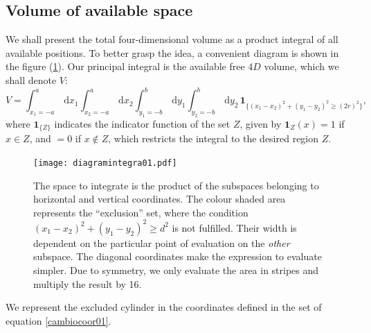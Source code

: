 \documentclass[a4paper,10pt, jcp, aps, preprint]{revtex4-1}
\newcommand{\rd}{\, \mathrm{d}}
\newcommand{\indicator}[1]{\mathbf{1}_{ \{   #1 \} } }
\begin{document}
\subsection{Volume of available space}

We shall present the total four-dimensional volume as a product integral
of all available positions. To better grasp the idea, a convenient
diagram is shown in the figure (\ref{diagintegra01}). Our
principal integral is the available free $4D$ volume, which 
we shall denote $V$:
\begin{equation}\label{volindic}
 V = \int_{x_1 = -a}^a \rd x_1 \int_{x_2 = -a}^a \rd x_2 
\int_{y_1 = -b}^b \rd y_1 \int_{y_2 = -b}^b \rd y_2 \, \indicator{ (x_1-x_2)^2 + (y_1-y_2)^2 \ge (2r)^2 },
\end{equation}
where $\indicator{Z}$ indicates the indicator function of the set $Z$, 
given by $\mathbf{1}_Z (x) = 1$ if $x \in Z$, and $=0$ if $x \notin Z$, 
which restricts the integral to the desired region $Z$.

\begin{figure}[h]
  \begin{center}
    \texttt{[image: diagramintegra01.pdf]}
    \caption{The space to integrate is the product of the subspaces
      belonging to horizontal and vertical coordinates. The colour
      shaded area represents the ``exclusion'' set, where the condition 
      $ (x_1-x_2)^2 + (y_1-y_2)^2 \ge d^2 $ is not fulfilled. 
      Their width is dependent on the particular point of evaluation
      on the \emph{other} subspace. The diagonal coordinates
      make the expression to evaluate simpler. Due to 
      symmetry, we only evaluate the area in stripes and
      multiply the result by 16.}\label{diagintegra01}
  \end{center}
\end{figure}

We represent the excluded cylinder in the coordinates defined in 
the set of equation \ref{cambiocoor01}. 
\end{document}
